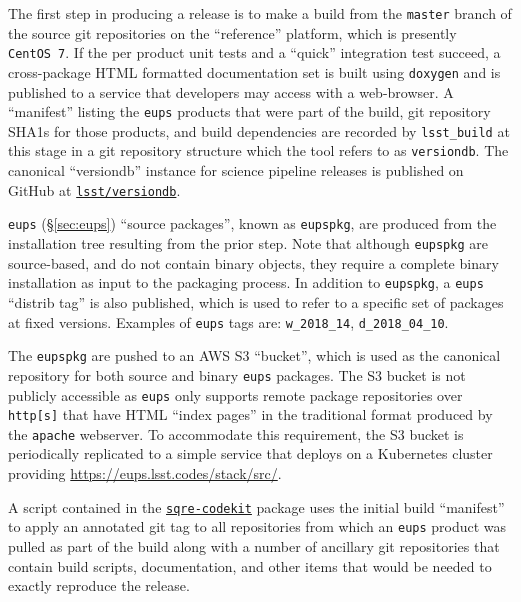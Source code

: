 The first step in producing a release is to make a build from the
\texttt{master} branch of the source git repositories on the ``reference''
platform, which is presently \texttt{CentOS~7}.  If the per product unit tests
and a ``quick'' integration test succeed, a cross-package HTML
formatted documentation set is built using \texttt{doxygen}\cite{doxygen} and is published to
a service that developers may access with a web-browser.
A ``manifest'' listing the \texttt{eups} products that were part of the build,
git repository SHA1s for those products, and build dependencies are recorded by
\texttt{lsst\_build} at this stage in a git repository structure which the tool
refers to as \texttt{versiondb}.  The canonical ``versiondb'' instance for science
pipeline releases is published on GitHub at
\href{https://github.com/lsst/versiondb}{\texttt{lsst/versiondb}}.

\label{sec:scipipe-deploy-src}
\texttt{eups} (\S\ref{sec:eups}) ``source packages'', known as \texttt{eupspkg}, are
produced from the installation tree resulting from the prior step.  Note that
although \texttt{eupspkg} are source-based, and do not contain binary objects,
they require a complete binary installation as input to the packaging process.
In addition to \texttt{eupspkg}, a \texttt{eups} ``distrib tag'' is also
published, which is used to refer to a specific set of packages at fixed
versions.  Examples of \texttt{eups} tags are: \texttt{w\_2018\_14}, \texttt{d\_2018\_04\_10}.

\noindent The \texttt{eupspkg} are pushed to an AWS S3 ``bucket'', which is used as the
canonical repository for both source and binary \texttt{eups} packages.  The S3
bucket is not publicly accessible as \texttt{eups} only supports remote
package repositories over \texttt{http[s]} that have HTML ``index
pages'' in the traditional format produced by the \texttt{apache}
webserver.  To accommodate this
requirement, the S3 bucket is periodically replicated to a simple
service that deploys on a Kubernetes cluster providing \url{https://eups.lsst.codes/stack/src/}.

A script contained in the
\href{https://github.com/lsst-sqre/sqre-codekit}{\texttt{sqre-codekit}} package
uses the initial build ``manifest'' to apply an annotated git tag to all
repositories from which an \texttt{eups} product was pulled as part of the
build along with a number of ancillary git repositories that contain build
scripts, documentation, and other items that would be needed to exactly reproduce the
release.

